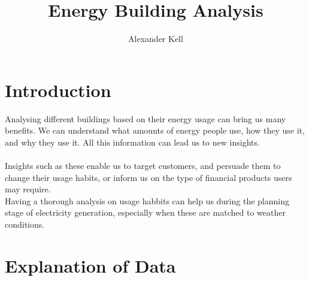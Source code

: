\documentclass[12pt]{article}\usepackage[]{graphicx}\usepackage[]{color}
\title{Energy Building Analysis}  %
\author{Alexander Kell}          %
\begin{document}



\maketitle              %


\section{Introduction}

Analysing different buildings based on their energy usage can bring us many benefits. We can understand what amounts of energy people use, how they use it, and why they use it. All this information can lead us to new insights. 
\\\\
Insights such as these enable us to target customers, and persuade them to change their usage habits, or inform us on the type of financial products users may require. \\

Having a thorough analysis on usage habbits can help us during the planning stage of electricity generation, especially when these are matched to weather conditions. \\

\section{Explanation of Data}
\end{document}

